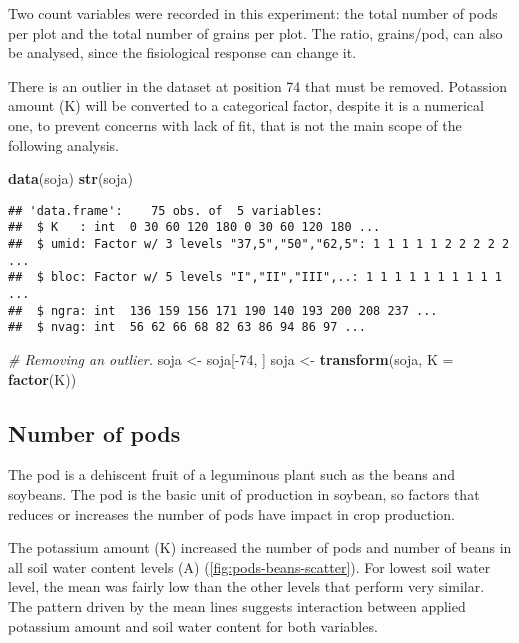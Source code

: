 \documentclass[9pt,a5paper,]{book}
\newenvironment{Shaded}{}{}
\newcommand{\KeywordTok}[1]{\textbf{{#1}}}
\newcommand{\DataTypeTok}[1]{\underline{{#1}}}
\newcommand{\DecValTok}[1]{{#1}}
\newcommand{\StringTok}[1]{{#1}}
\newcommand{\CommentTok}[1]{\textit{{#1}}}
\newcommand{\NormalTok}[1]{{#1}}
\renewenvironment{Shaded}{\color{inputcolor}}{}
\renewcommand{\DataTypeTok}[1]{{#1}}
\theoremstyle{definition}
\theoremstyle{definition}
\theoremstyle{remark}
\begin{document}
Two count variables were recorded in this experiment: the total number
of pods per plot and the total number of grains per plot. The ratio,
grains/pod, can also be analysed, since the fisiological response can
change it.

There is an outlier in the dataset at position 74 that must be removed.
Potassion amount (K) will be converted to a categorical factor, despite
it is a numerical one, to prevent concerns with lack of fit, that is not
the main scope of the following analysis.

\begin{Shaded}
\begin{Highlighting}[]
\KeywordTok{data}\NormalTok{(soja)}
\KeywordTok{str}\NormalTok{(soja)}
\end{Highlighting}
\end{Shaded}

\begin{verbatim}
## 'data.frame':    75 obs. of  5 variables:
##  $ K   : int  0 30 60 120 180 0 30 60 120 180 ...
##  $ umid: Factor w/ 3 levels "37,5","50","62,5": 1 1 1 1 1 2 2 2 2 2 ...
##  $ bloc: Factor w/ 5 levels "I","II","III",..: 1 1 1 1 1 1 1 1 1 1 ...
##  $ ngra: int  136 159 156 171 190 140 193 200 208 237 ...
##  $ nvag: int  56 62 66 68 82 63 86 94 86 97 ...
\end{verbatim}

\begin{Shaded}
\begin{Highlighting}[]
\CommentTok{# Removing an outlier.}
\NormalTok{soja <-}\StringTok{ }\NormalTok{soja[-}\DecValTok{74}\NormalTok{, ]}
\NormalTok{soja <-}\StringTok{ }\KeywordTok{transform}\NormalTok{(soja, }\DataTypeTok{K =} \KeywordTok{factor}\NormalTok{(K))}
\end{Highlighting}
\end{Shaded}

\subsection{Number of pods}\label{number-of-pods}

The pod is a dehiscent fruit of a leguminous plant such as the beans and
soybeans. The pod is the basic unit of production in soybean, so factors
that reduces or increases the number of pods have impact in crop
production.

The potassium amount (K) increased the number of pods and number of
beans in all soil water content levels (A)
(\ref{fig:pods-beans-scatter}). For lowest soil water level, the mean
was fairly low than the other levels that perform very similar. The
pattern driven by the mean lines suggests interaction between applied
potassium amount and soil water content for both variables.
\end{document}
